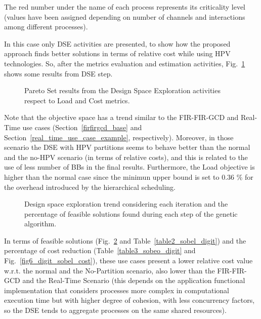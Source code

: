 %
The red number under the name of each process represents its criticality level (values have been assigned depending on number of channels and interactions among different processes). \par
In this case only DSE activities are presented, to show how the proposed approach finds better solutions in terms of relative cost while using HPV technologies. So, after the metrics evaluation and estimation activities, Fig.~\ref{fig6_digit_sobel} shows some results from DSE step. \par
%
%
\begin{figure}[htbp]
    \centering
    \label{6b_digit}
     \label{6d_sobel} 
  \caption{Pareto Set results from the Design Space Exploration activities respect to Load and Cost metrics.}
  \label{fig6_digit_sobel} 
\end{figure}
%
Note that the objective space has a trend similar to the FIR-FIR-GCD and Real-Time use cases (Section~\ref{firfirgcd_base} and Section~\ref{real_time_use_case_example}, respectively). Moreover, in those scenario the DSE with HPV partitions seems to behave better than the normal and the no-HPV scenario (in terms of relative costs), and this is related to the use of less number of BBs in the final results. Furthermore, the Load objective is higher than the normal case since the minimun upper bound is set to 0.36 \% for the overhead introduced by the  hierarchical scheduling. \par
%
\begin{figure}[htbp]
    \centering
    \label{6b_digit_feasible} 
     \label{6d_sobel_feasible} 
  \caption{Design space exploration trend considering each iteration and the percentage of feasible solutions found during each step of the genetic algorithm.}
  \label{fig6_digit_sobel_feasible} 
\end{figure}
%
In terms of feasible solutions (Fig.~\ref{fig6_digit_sobel_feasible} and Table~\ref{table2_sobel_digit}) and the percentage of cost reduction (Table~\ref{table3_sobeo_digit} and Fig.~\ref{fig6_digit_sobel_cost}), these use cases present a lower relative cost value w.r.t. the normal and the No-Partition scenario, also lower than the FIR-FIR-GCD and the Real-Time Scenario (this depends on the application functional implementation that considers processes more complex in computational execution time but with higher degree of cohesion, with less concurrency factors, so the DSE tends to aggregate processes on the same shared resources). \par
